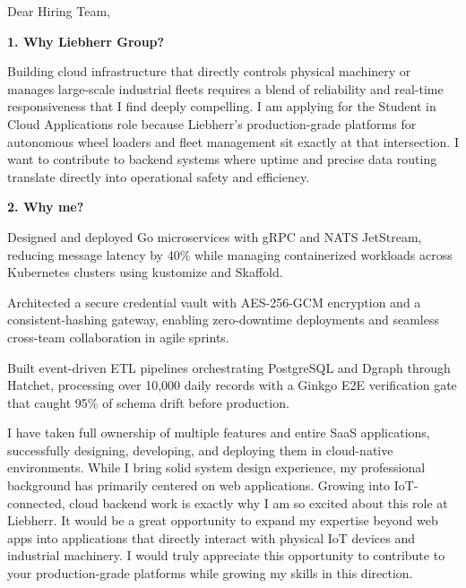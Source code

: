 \documentclass[11pt,a4paper]{coverletter}
\begin{document}

\opening{Dear Hiring Team,}

\vspace{8pt}\noindent\textbf{1. Why Liebherr Group?}\par\vspace{3pt}

Building cloud infrastructure that directly controls physical machinery or manages large-scale industrial fleets requires a blend of reliability and real-time responsiveness that I find deeply compelling. I am applying for the Student in Cloud Applications role because Liebherr’s production-grade platforms for autonomous wheel loaders and fleet management sit exactly at that intersection. I want to contribute to backend systems where uptime and precise data routing translate directly into operational safety and efficiency.

\vspace{8pt}\noindent\textbf{2. Why me?}\par\vspace{3pt}

\bullets

  \item Designed and deployed Go microservices with gRPC and NATS JetStream, reducing message latency by 40\% while managing containerized workloads across Kubernetes clusters using kustomize and Skaffold.

  \item Architected a secure credential vault with AES-256-GCM encryption and a consistent-hashing gateway, enabling zero-downtime deployments and seamless cross-team collaboration in agile sprints.

  \item Built event-driven ETL pipelines orchestrating PostgreSQL and Dgraph through Hatchet, processing over 10,000 daily records with a Ginkgo E2E verification gate that caught 95\% of schema drift before production.

\bulletsend

I have taken full ownership of multiple features and entire SaaS applications, successfully designing, developing, and deploying them in cloud-native environments. While I bring solid system design experience, my professional background has primarily centered on web applications. Growing into IoT-connected, cloud backend work is exactly why I am so excited about this role at Liebherr. It would be a great opportunity to expand my expertise beyond web apps into applications that directly interact with physical IoT devices and industrial machinery. I would truly appreciate this opportunity to contribute to your production-grade platforms while growing my skills in this direction.
\end{document}
